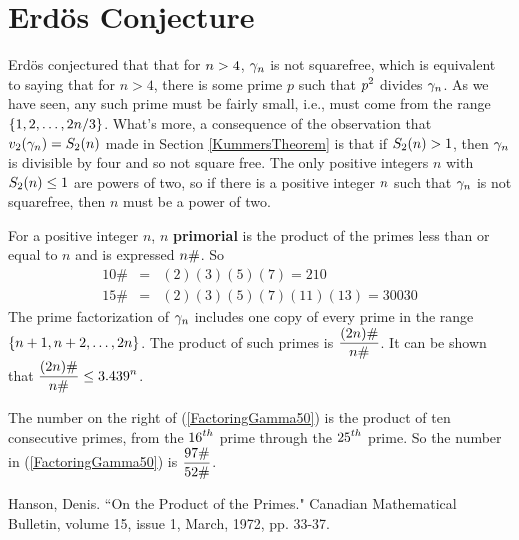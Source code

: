 \section*{Erd\"{o}s Conjecture}

Erd\"{o}s conjectured that that for $\displaystyle n>4$, $\displaystyle \gamma_n$ is not squarefree, which is equivalent to saying that for $n>4$, there is some prime $p$ such that $\displaystyle p^2$ divides $\displaystyle \gamma_n$. As we have seen, any such prime must be fairly small, i.e., must come from the range $\displaystyle \left\{ 1,2,\ldots, 2n/3\right\}$. What's more, a consequence of the observation that $\displaystyle v_2(\gamma_n) = S_2(n)$ made in Section \ref{KummersTheorem} is that if $\displaystyle S_2(n)>1$, then $\displaystyle \gamma_n$ is divisible by four and so not square free. The only positive integers $n$ with $\displaystyle S_2(n)\leq 1$ are powers of two, so if there is a positive integer $\displaystyle n$ such that $\displaystyle \gamma_n$ is not squarefree, then $n$ must be a power of two.

For a positive integer $n$, $n$ \textbf{primorial} is the product of the primes less than or equal to $n$ and is expressed $\displaystyle n\# $. So
\begin{eqnarray*}
 10\# & = & (2)(3)(5)(7) = 210 \\
 15 \# & = & (2)(3)(5)(7)(11)(13) = 30030
\end{eqnarray*}
The prime factorization of $\displaystyle \gamma_n$ includes one copy of every prime in the range $\displaystyle \left\{ n+1, n+2, \ldots, 2n\right\}$. The product of such primes is $\displaystyle \frac{(2n)\#}{n \#}$. It can be shown that $\displaystyle \frac{(2n)\#}{n \#} \leq 3.439^n$.



The number on the right of (\ref{FactoringGamma50}) is the product of ten consecutive primes, from the $\displaystyle 16^{th}$ prime through the $\displaystyle 25^{th}$ prime. 
So the number in (\ref{FactoringGamma50}) is $\displaystyle \frac{97 \#}{52 \#}$.



\begin{thebibliography}{99} 

 Hanson, Denis. ``On the Product of the Primes." Canadian Mathematical Bulletin, volume 15, issue 1, March, 1972, pp. 33-37.

\end{thebibliography}
\fi




